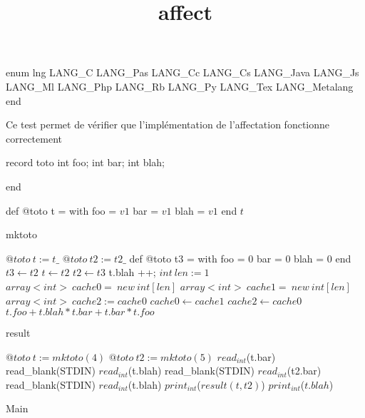 \documentclass[8pt]{article}
\title{affect}
\begin{document}
\maketitle
enum lng 
  LANG\_C
   LANG\_Pas
   LANG\_Cc
   LANG\_Cs
   LANG\_Java
   LANG\_Js
   LANG\_Ml
   LANG\_Php
   LANG\_Rb
   LANG\_Py
   LANG\_Tex
   LANG\_Metalang
end


Ce test permet de v\'erifier que l'impl\'ementation de l'affectation fonctionne correctement

record toto int foo;
int bar;
int blah;

end

\begin{algorithm}[H]
def @toto t = with foo = $ v1 $
bar = $ v1 $
blah = $ v1 $ end
\Return $ t $\;
\caption{mktoto}
\end{algorithm}
\begin{algorithm}[H]
$@toto\:t := t\_$\;
$@toto\:t2 := t2\_$\;
def @toto t3 = with foo = $ 0 $
bar = $ 0 $
blah = $ 0 $ end
$t3 \leftarrow t2 $\;
$t \leftarrow t2 $\;
$t2 \leftarrow t3 $\;
t.blah ++;
$int\:len := 1$\;
$array<int>\:cache0=\:new\:int[len]$\;
$array<int>\:cache1=\:new\:int[len]$\;
$array<int>\:cache2 := cache0$\;
$cache0 \leftarrow cache1 $\;
$cache2 \leftarrow cache0 $\;
\Return $ t.foo + t.blah * t.bar + t.bar * t.foo $\;
\caption{result}
\end{algorithm}

\begin{algorithm}[H]
$@toto\:t := mktoto(4)$\;
$@toto\:t2 := mktoto(5)$\;
$read_{int}$(t.bar)\;
read\_blank(STDIN)\;
$read_{int}$(t.blah)\;
read\_blank(STDIN)\;
$read_{int}$(t2.bar)\;
read\_blank(STDIN)\;
$read_{int}$(t.blah)\;
$print_{int}$($ result(t, t2) $)\;
$print_{int}$($ t.blah $)\;
\caption{Main}
\end{algorithm}
\end{document}
